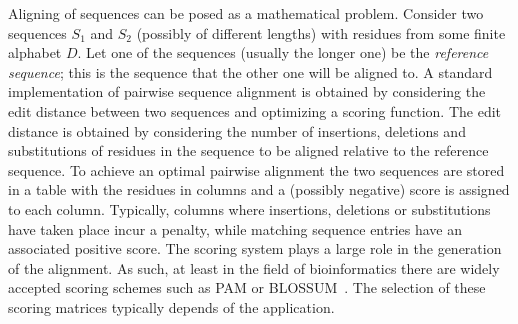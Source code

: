 
Aligning of sequences can be posed as a mathematical problem. Consider two sequences $S_1$ and $S_2$ (possibly of different lengths) with residues from some finite alphabet $D$. Let one of the sequences (usually the longer one) be the \textit{reference sequence}; this is the sequence that the other one will be aligned to.
A standard implementation of pairwise sequence alignment is obtained by considering the edit distance between two sequences and optimizing a scoring function. The edit distance is obtained by considering the number of insertions, deletions and substitutions of residues in the sequence to be aligned relative to the reference sequence. To achieve an optimal pairwise alignment the two sequences are stored in a table with the residues in columns and a (possibly negative) score is assigned to each column. Typically, columns where insertions, deletions or substitutions have taken place incur a penalty, while matching sequence entries have an associated positive score. The scoring system plays a large role in the generation of the alignment. As such, at least in the field of bioinformatics there are widely accepted scoring schemes such as PAM or BLOSSUM~\cite{mount2008comparison}. The selection of these scoring matrices typically depends of the application.

